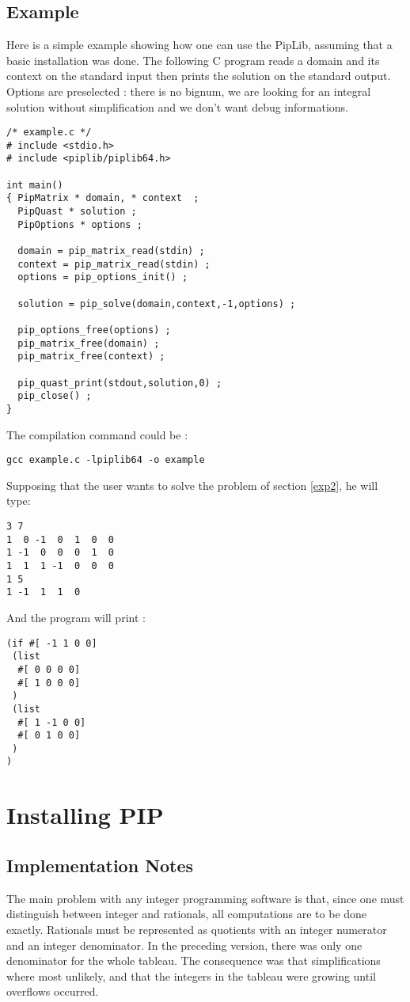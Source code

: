 \documentclass[12pt,a4paper,dvips]{article}
\begin{document}
\subsection{Example}
Here is a simple example showing how one can use the PipLib, assuming that
a basic installation was done. The following C program reads a domain and its
context on the standard input then prints the solution on the standard output.
Options are preselected : there is no bignum, we are looking for an integral
solution without simplification and we don't want debug informations.
\begin{verbatim}
/* example.c */
# include <stdio.h>
# include <piplib/piplib64.h>

int main()
{ PipMatrix * domain, * context  ;
  PipQuast * solution ;
  PipOptions * options ;
 
  domain = pip_matrix_read(stdin) ;
  context = pip_matrix_read(stdin) ;
  options = pip_options_init() ;

  solution = pip_solve(domain,context,-1,options) ;

  pip_options_free(options) ;
  pip_matrix_free(domain) ;
  pip_matrix_free(context) ;

  pip_quast_print(stdout,solution,0) ;
  pip_close() ;
}
\end{verbatim}
The compilation command could be :
\begin{verbatim}
gcc example.c -lpiplib64 -o example
\end{verbatim}
Supposing that the user wants to solve the problem of section \ref{exp2}, he
will type:
\begin{verbatim}
3 7
1  0 -1  0  1  0  0 
1 -1  0  0  0  1  0 
1  1  1 -1  0  0  0 
1 5
1 -1  1  1  0 
\end{verbatim}
And the program will print :
\begin{verbatim}
(if #[ -1 1 0 0]
 (list
  #[ 0 0 0 0]
  #[ 1 0 0 0]
 )
 (list
  #[ 1 -1 0 0]
  #[ 0 1 0 0]
 )
)
\end{verbatim}

\section{Installing PIP}

\subsection{Implementation Notes}

The main problem with any integer programming software is that, since one
must distinguish between integer and rationals, all computations are
to be done exactly. Rationals must be represented as quotients with
an integer numerator and an integer denominator. In the preceding version,
there was only one denominator for the whole tableau. The consequence
was that simplifications where most unlikely, and that the integers
in the tableau were growing until overflows occurred.
\end{document}
